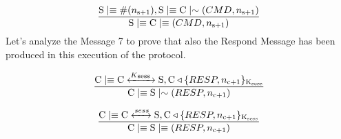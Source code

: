 \[ \frac{ \textnormal{S} \mid\equiv \#(n\textsubscript{s+1}), \textnormal{S} \mid\equiv \textnormal{C} \mid\sim (CMD,n\textsubscript{s+1}) } 
        {\textnormal{S} \mid\equiv \textnormal{C} \mid\equiv (CMD,n\textsubscript{s+1})}\]
Let's analyze the Message 7 to prove that also the Respond Message has been produced in this execution of the protocol.

\[ \frac{\textnormal{C} \mid\equiv \textnormal{C} \xleftrightarrow{K\textsubscript{sess }} \textnormal{S}, \textnormal{C} \triangleleft \lbrace RESP, n\textsubscript{c+1} \rbrace \textsubscript{K\textsubscript{sess}}}{ \textnormal{C} \mid\equiv \textnormal{S} \mid\sim (RESP,n\textsubscript{c+1})} 
\]

\[ \frac{\textnormal{C} \mid\equiv \textnormal{C} \xleftrightarrow{sess } \textnormal{S}, \textnormal{C} \triangleleft \lbrace RESP,n\textsubscript{c+1} \rbrace \textsubscript{K\textsubscript{sess}} }{\textnormal{C} \mid\equiv \textnormal{S} \mid\equiv (RESP,n\textsubscript{c+1})}
\]